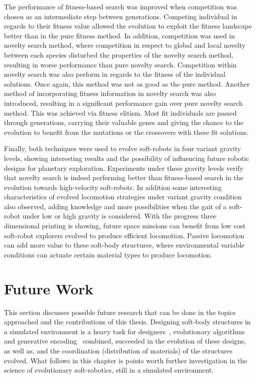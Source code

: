 The performance of fitness-based search was improved when competition was chosen as an intermediate step between generations. Competing individual in regards to their fitness value allowed the evolution to exploit the fitness landscape better than in the pure fitness method. In addition, competition was used in novelty search method, where competition in respect to global and local novelty between each species disturbed the properties of the novelty search method, resulting in worse performance than pure novelty search. Competition within novelty search was also perform in regards to the fitness of the individual solutions. Once again, this method was not as good as the pure method. Another method of incorporating fitness information in novelty search was also introduced, resulting in a significant performance gain over pure novelty search method. This was achieved via fitness elitism. Most fit individuals are passed through generations, carrying their valuable genes and giving the chance to the evolution to benefit from the mutations or the crossovers with these fit solutions. 

Finally, both techniques were used to evolve soft-robots in four variant gravity levels, showing interesting results and the possibility of influencing future robotic designs for planetary exploration. Experiments under these gravity levels verify that novelty search is indeed performing better than fitness-based search in the evolution towards high-velocity soft-robots. In addition some interesting characteristics of evolved locomotion strategies under variant gravity condition also observed, adding knowledge and more possibilities when the gait of a soft-robot under low or high gravity is considered. With the progress three dimensional printing is showing, future space missions can benefit from low cost soft-robot explorers evolved to produce efficient locomotion. Passive locomotion can add more value to these soft-body structures, where environmental variable conditions can actuate certain material types to produce locomotion.

\section{Future Work} %

This section discusses possible future research that can be done in the topics approached and the contributions of this thesis. Designing soft-body structures in a simulated environment is a heavy task for designers~\citep{cheney2013unshackling}, evolutionary algorithms~\citep{stanley2002evolving} and generative encoding~\citep{stanley2007compositional} combined, succeeded in the evolution of these designs, as well as, and the coordination (distribution of materials) of the structures evolved. What follows in this chapter is points worth further investigation in the science of evolutionary soft-robotics, still in a simulated environment.

